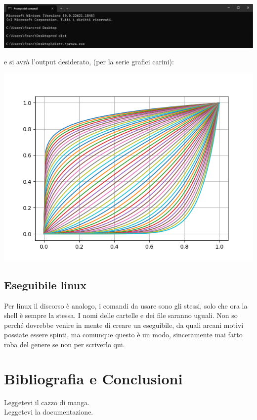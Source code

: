 \documentclass[10pt,a4paper]{article}
\begin{document}
\begin{center}
\includegraphics[scale=0.35]{img/p_2.png}
\end{center}
e si avrà l'output desiderato, (per la serie grafici carini):

\begin{center}
\includegraphics[scale=0.8]{img/exe_img.png}
\end{center}

\subsection{Eseguibile linux}
Per linux il discorso è analogo, i comandi da usare sono gli stessi, solo che ora la shell è sempre la stessa. I nomi delle cartelle e dei file saranno uguali. Non so perché dovrebbe venire in mente di creare un eseguibile, da quali arcani motivi possiate essere spinti, ma comunque questo è un modo, sinceramente mai fatto roba del genere se non per scriverlo qui.
\newpage


\section{Bibliografia e Conclusioni}
Leggetevi il cazzo di manga.\\
Leggetevi la documentazione.\\
\end{document}
